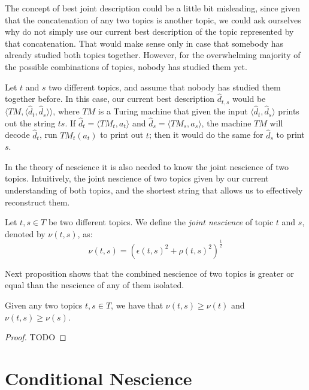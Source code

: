The concept of best joint description could be a little bit misleading, since given that the concatenation of any two topics is another topic, we could ask ourselves why do not simply use our current best description of the topic represented by that concatenation. That would make sense only in case that somebody has already studied both topics together. However, for the overwhelming majority of the possible combinations of topics, nobody has studied them yet.

\begin{example}
\label{ex:unknown_join}
Let $t$ and $s$ two different topics, and assume that nobody has studied them together before. In this case, our current best description $\hat{d}_{t, s}$ would be $\langle TM, \langle \hat{d}_t, \hat{d}_s \rangle \rangle$, where $TM$ is a Turing machine that given the input $\langle \hat{d}_t, \hat{d}_s \rangle$ prints out the string $ts$. If $\hat{d}_t = \langle TM_t, a_t \rangle$ and $\hat{d}_s = \langle TM_s, a_s \rangle$, the machine $TM$ will decode $\hat{d}_t$, run $TM_t(a_t)$ to print out $t$; then it would do the same for $\hat{d}_s$ to print $s$.
\end{example}

In the theory of nescience it is also needed to know the joint nescience of two topics. Intuitively, the joint nescience of two topics given by our current understanding of both topics, and the shortest string that allows us to effectively reconstruct them.

\begin{definition}
Let $t,s \in T$ be two different topics. We define the \emph{joint nescience} of topic $t$ and $s$, denoted by $\nu(t,s)$, as: 
\[
\nu(t, s) = \left( \epsilon\left( t, s \right)^2 + \rho\left( t,s \right)^2 \right) ^ \frac{1}{2}
\]
\end{definition}

Next proposition shows that the combined nescience of two topics is greater or equal than the nescience of any of them isolated.

\begin{proposition}
Given any two topics $t,s \in T$, we have that $\nu(t,s) \geq \nu(t)$ and $\nu(t,s) \geq \nu(s)$.
\end{proposition}
\begin{proof}
{\color{red}TODO}
\end{proof}

%
%

\section{Conditional Nescience}

